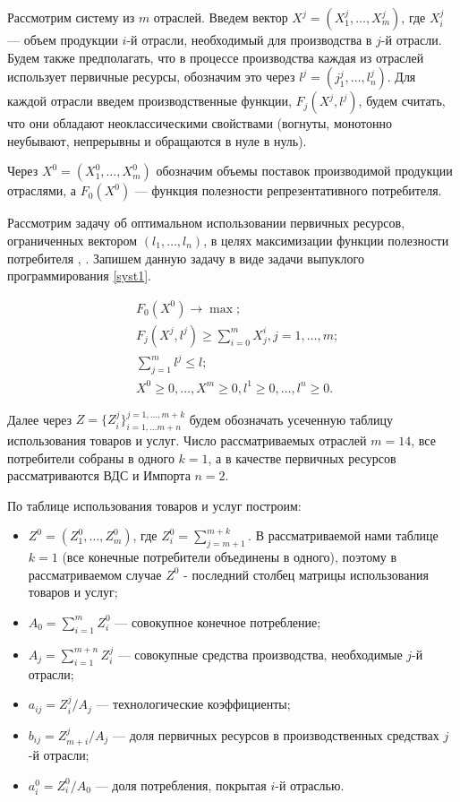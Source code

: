 \documentclass[12pt, a4paper]{article}
\begin{document}
Рассмотрим систему из $m$ отраслей. Введем вектор $X^j = (X^j_1, \ldots, X^j_m)$, где $X_i^j$ --- объем продукции $i$-й отрасли, необходимый для производства в $j$-й отрасли. Будем также предполагать, что в процессе производства каждая из отраслей использует первичные ресурсы, обозначим это через $l^j = (j_1^j, \ldots, l_n^j)$. Для каждой отрасли введем производственные функции, $F_j(X^j, l^j)$, будем считать, что они обладают неоклассическими свойствами (вогнуты, монотонно неубывают, непрерывны и обращаются в нуле в нуль).

Через $X^0 = (X^0_1,\ldots, X^0_m)$ обозначим объемы поставок производимой продукции отраслями, а $F_0(X^0)$ --- функция полезности репрезентативного потребителя.

Рассмотрим задачу об оптимальном использовании первичных ресурсов, ограниченных вектором $(l_1, \ldots, l_n)$, в целях максимизации функции полезности потребителя \cite{InverseShan}, \cite{Akimova}. Запишем данную задачу в виде задачи выпуклого программирования \eqref{syst1}.

\begin{equation}\label{syst1}
\begin{aligned}
&F_0(X^0) \rightarrow \max;\\
&F_j(X^j, l^j) \geq \sum\limits_{i=0}^{m}X_j^i, j = 1,\ldots,m;\\
&\sum\limits_{j=1}^m l^j \leq l;\\
&X^0 \geq 0, \ldots, X^m \geq 0, l^1 \geq 0,\ldots,l^n \geq 0. 
\end{aligned}
\end{equation}

Далее через $Z = \{Z_i^j\}_{i=1,\ldots m+n}^{j = 1, \ldots, m+k}$ будем обозначать усеченную таблицу использования товаров и услуг. Число рассматриваемых отраслей $m = 14$, все потребители собраны в одного $k = 1$, а в качестве первичных ресурсов рассматриваются ВДС и Импорта $n = 2$.

По таблице использования товаров и услуг построим:
\begin{itemize}
\item $Z^0 = (Z_1^0, \ldots, Z_m^0)$, где $Z_i^0 = \sum\limits_{j = m + 1}^{m + k}$. В рассматриваемой нами таблице $k = 1$ (все конечные потребители объединены в одного), поэтому в рассматриваемом случае $Z^0$ - последний столбец матрицы использования товаров и услуг;
\item $A_0 = \sum\limits_{i=1}^m Z_i^0$ --- совокупное конечное потребление;
\item $A_j = \sum\limits_{i=1}^{m+n} Z_i^j$ --- совокупные средства производства, необходимые $j$-й отрасли;
\item $a_{ij} = Z_i^j / A_j$ --- технологические коэффициенты;
\item $b_{ij} = Z_{m+i}^j / A_j$ --- доля первичных ресурсов в производственных средствах $j$-й отрасли;
\item $a^0_i = Z_i^0 / A_0$ --- доля потребления, покрытая $i$-й отраслью.
\end{itemize}
\end{document}
